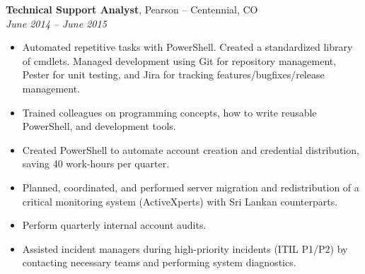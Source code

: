 {\bf Technical Support Analyst}, Pearson – Centennial, CO\\
{\it June 2014 – June 2015}
\begin{itemize}
	\item Automated repetitive tasks with PowerShell. Created a standardized library of cmdlets. Managed development using Git for repository management, Pester for unit testing, and Jira for tracking features/bugfixes/release management.
	\item Trained colleagues on programming concepts, how to write reusable PowerShell, and development tools.
	\item Created PowerShell to automate account creation and credential distribution, saving 40 work-hours per quarter.
	\item Planned, coordinated, and performed server migration and redistribution of a critical monitoring system (ActiveXperts) with Sri Lankan counterparts.
	\item Perform quarterly internal account audits.
	\item Assisted incident managers during high-priority incidents (ITIL P1/P2) by contacting necessary teams and performing system diagnostics.
\end{itemize}